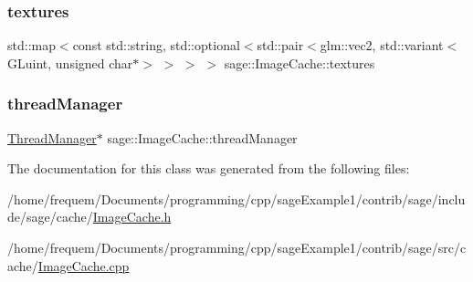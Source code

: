 \mbox{\label{classsage_1_1ImageCache_a01b8aa5587b2cf9c5e1f1059431f0118}} 
\subsubsection{\texorpdfstring{textures}{textures}}
{\footnotesize\ttfamily std\+::map$<$const std\+::string, std\+::optional$<$std\+::pair$<$glm\+::vec2, std\+::variant$<$G\+Luint, unsigned char$\ast$$>$ $>$ $>$ $>$ sage\+::\+Image\+Cache\+::textures\hspace{0.3cm}{\ttfamily [private]}}

\mbox{\label{classsage_1_1ImageCache_a114e9da7a04c34fa4521c8421729e60a}} 
\subsubsection{\texorpdfstring{threadManager}{threadManager}}
{\footnotesize\ttfamily \mbox{\hyperlink{classsage_1_1ThreadManager}{Thread\+Manager}}$\ast$ sage\+::\+Image\+Cache\+::thread\+Manager\hspace{0.3cm}{\ttfamily [private]}}



The documentation for this class was generated from the following files\+:\begin{DoxyCompactItemize}
\item 
/home/frequem/\+Documents/programming/cpp/sage\+Example1/contrib/sage/include/sage/cache/\mbox{\hyperlink{ImageCache_8h}{Image\+Cache.\+h}}\item 
/home/frequem/\+Documents/programming/cpp/sage\+Example1/contrib/sage/src/cache/\mbox{\hyperlink{ImageCache_8cpp}{Image\+Cache.\+cpp}}\end{DoxyCompactItemize}
